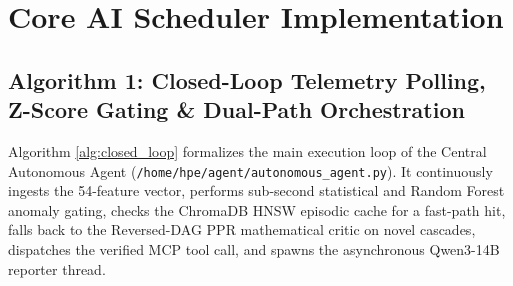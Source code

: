 \section{Core AI Scheduler Implementation}

\subsection*{Algorithm 1: Closed-Loop Telemetry Polling, Z-Score Gating \& Dual-Path Orchestration}
Algorithm \ref{alg:closed_loop} formalizes the main execution loop of the Central Autonomous Agent (\texttt{/home/hpe/agent/autonomous\_agent.py}). It continuously ingests the 54-feature vector, performs sub-second statistical and Random Forest anomaly gating, checks the ChromaDB HNSW episodic cache for a fast-path hit, falls back to the Reversed-DAG PPR mathematical critic on novel cascades, dispatches the verified MCP tool call, and spawns the asynchronous Qwen3-14B reporter thread.

